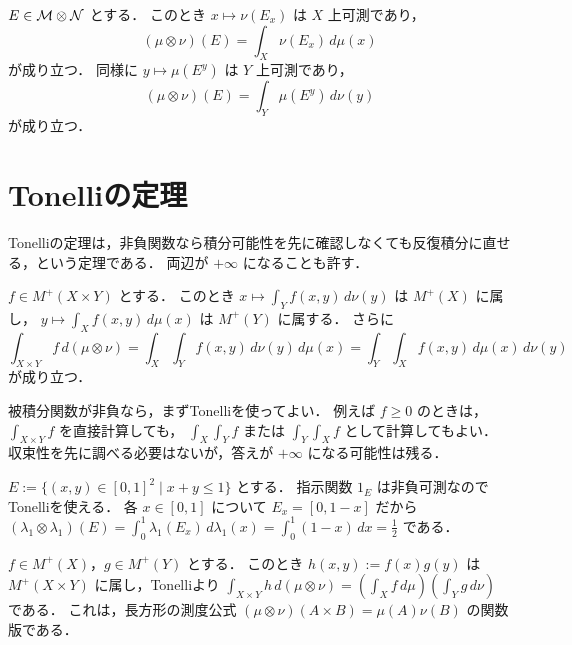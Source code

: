 \begin{theorem}[Cavalieriの原理]\label{thm:cavalieri-product-measure}
$E\in\mathcal M\otimes\mathcal N$ とする．
このとき $x\mapsto \nu(E_x)$ は $X$ 上可測であり，
\[
(\mu\otimes\nu)(E)=\int_X \nu(E_x)\,d\mu(x)
\]
が成り立つ．
同様に $y\mapsto \mu(E^y)$ は $Y$ 上可測であり，
\[
(\mu\otimes\nu)(E)=\int_Y \mu(E^y)\,d\nu(y)
\]
が成り立つ．
\end{theorem}

\section{Tonelliの定理}

Tonelliの定理は，非負関数なら積分可能性を先に確認しなくても反復積分に直せる，という定理である．
両辺が $+\infty$ になることも許す．

\begin{theorem}[Tonelliの定理]\label{thm:tonelli}
$f\in M^+(X\times Y)$ とする．
このとき $x\mapsto \int_Y f(x,y)\,d\nu(y)$ は $M^+(X)$ に属し，
$y\mapsto \int_X f(x,y)\,d\mu(x)$ は $M^+(Y)$ に属する．
さらに
\[
\int_{X\times Y} f\,d(\mu\otimes\nu)=\int_X\!\int_Y f(x,y)\,d\nu(y)\,d\mu(x)=\int_Y\!\int_X f(x,y)\,d\mu(x)\,d\nu(y)
\]
が成り立つ．
\end{theorem}

\begin{remark}[使い方]
被積分関数が非負なら，まずTonelliを使ってよい．
例えば $f\ge0$ のときは，$\int_{X\times Y}f$ を直接計算しても，
$\int_X\int_Y f$ または $\int_Y\int_X f$ として計算してもよい．
収束性を先に調べる必要はないが，答えが $+\infty$ になる可能性は残る．
\end{remark}

\begin{example}[三角形の面積]\label{ex:triangle-area-tonelli}
$E:=\{(x,y)\in[0,1]^2\mid x+y\le1\}$ とする．
指示関数 $1_E$ は非負可測なのでTonelliを使える．
各 $x\in[0,1]$ について $E_x=[0,1-x]$ だから
$(\lambda_1\otimes\lambda_1)(E)=\int_0^1 \lambda_1(E_x)\,d\lambda_1(x)=\int_0^1(1-x)\,dx=\frac12$ である．
\end{example}

\begin{example}[直積形の関数]\label{ex:product-function-tonelli}
$f\in M^+(X)$，$g\in M^+(Y)$ とする．
このとき $h(x,y):=f(x)g(y)$ は $M^+(X\times Y)$ に属し，Tonelliより
$\int_{X\times Y}h\,d(\mu\otimes\nu)=\left(\int_X f\,d\mu\right)\left(\int_Y g\,d\nu\right)$ である．
これは，長方形の測度公式 $(\mu\otimes\nu)(A\times B)=\mu(A)\nu(B)$ の関数版である．
\end{example}

